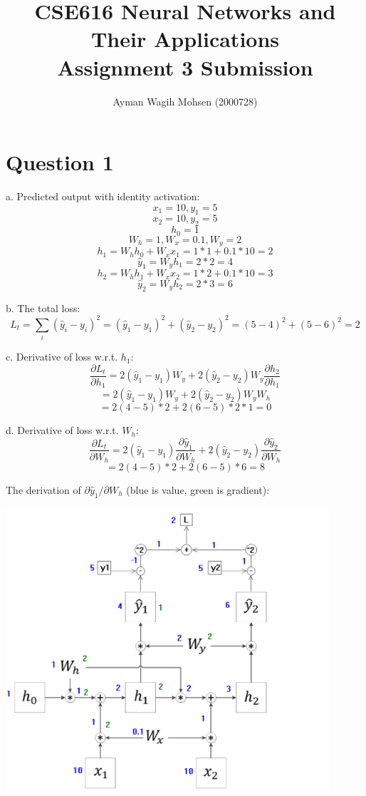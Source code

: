 \documentclass[10pt]{article}
\begin{document}
\title{CSE616 Neural Networks and Their Applications\\
Assignment 3 Submission}
\author{Ayman Wagih Mohsen (2000728)}
\maketitle

\section{Question 1}
a. Predicted output with identity activation:
\[	x_1=10, y_1=5\]
\[	x_2=10, y_2=5\]
\[	h_0=1\]
\[	W_h=1, W_x=0.1, W_y=2\]
\[	h_1=W_h h_0+W_x x_1=1*1+0.1*10=2\]
\[	\hat{y}_1=W_y h_1=2*2=4\]
\[	h_2=W_h h_1+W_x x_2=1*2+0.1*10=3\]
\[	\hat{y}_2=W_y h_2=2*3=6\]

b. The total loss:
\[	L_t=\sum_i (\hat{y}_i-y_i)^2
	=(\hat{y}_1-y_1)^2+(\hat{y}_2-y_2)^2
	=(5-4)^2+(5-6)^2
	=2\]

c. Derivative of loss w.r.t. $h_1$:
\[	\frac{\partial{L_t}}{\partial{h_1}}
	=2(\hat{y}_1-y_1)W_y+2(\hat{y}_2-y_2)W_y\frac{\partial{h_2}}{\partial{h_1}}\]
\[	=2(\hat{y}_1-y_1)W_y
	+2(\hat{y}_2-y_2)W_y W_h\]
\[	=2(4-5)*2+2(6-5)*2*1=0\]

d. Derivative of loss w.r.t. $W_h$:
\[	\frac{\partial{L_t}}{\partial{W_h}}
	=2(\hat{y}_1-y_1)\frac{\partial\hat y_1}{\partial W_h}
	+2(\hat{y}_2-y_2)\frac{\partial\hat y_2}{\partial W_h}\]
\[	=2(4-5)*2+2(6-5)*6=8\]

The derivation of $\partial\hat y_1/\partial W_h$ (blue is value, green is gradient):
\begin{center}
\includegraphics[width=0.9\textwidth]{20220524 Q1 attempt3a.PNG}
\end{center}
\end{document}
